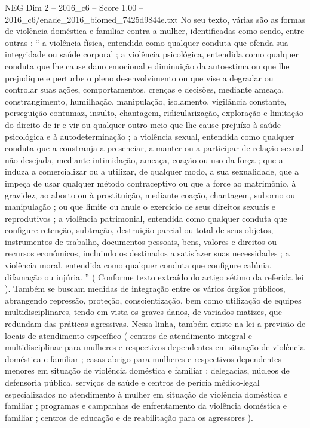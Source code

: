 \begin{textsample}{NEG Dim 2 – 2016\_c6 – Score 1.00 – 2016\_c6/enade\_2016\_biomed\_7425d9844e.txt}
No seu texto, várias são as formas de violência doméstica e familiar contra a mulher, identificadas como sendo, entre outras : “ a violência física, entendida como qualquer conduta que ofenda sua integridade ou saúde corporal ; a violência psicológica, entendida como qualquer conduta que lhe cause dano emocional e diminuição da autoestima ou que lhe prejudique e perturbe o pleno desenvolvimento ou que vise a degradar ou controlar suas ações, comportamentos, crenças e decisões, mediante ameaça, constrangimento, humilhação, manipulação, isolamento, vigilância constante, perseguição contumaz, insulto, chantagem, ridicularização, exploração e limitação do direito de ir e vir ou qualquer outro meio que lhe cause prejuízo à saúde psicológica e à autodeterminação ; a violência sexual, entendida como qualquer conduta que a constranja a presenciar, a manter ou a participar de relação sexual não desejada, mediante intimidação, ameaça, coação ou uso da força ; que a induza a comercializar ou a utilizar, de qualquer modo, a sua sexualidade, que a impeça de usar qualquer método contraceptivo ou que a force ao matrimônio, à gravidez, ao aborto ou à prostituição, mediante coação, chantagem, suborno ou manipulação ; ou que limite ou anule o exercício de seus direitos sexuais e reprodutivos ; a violência patrimonial, entendida como qualquer conduta que configure retenção, subtração, destruição parcial ou total de seus objetos, instrumentos de trabalho, documentos pessoais, bens, valores e direitos ou recursos econômicos, incluindo os destinados a satisfazer suas necessidades ; a violência moral, entendida como qualquer conduta que configure calúnia, difamação ou injúria. ” ( Conforme texto extraído do artigo sétimo da referida lei ).
Também se buscam medidas de integração entre os vários órgãos públicos, abrangendo repressão, proteção, conscientização, bem como utilização de equipes multidisciplinares, tendo em vista os graves danos, de variados matizes, que redundam das práticas agressivas.
Nessa linha, também existe na lei a previsão de locais de atendimento específico ( centros de atendimento integral e multidisciplinar para mulheres e respectivos dependentes em situação de violência doméstica e familiar ; casas-abrigo para mulheres e respectivos dependentes menores em situação de violência doméstica e familiar ; delegacias, núcleos de defensoria pública, serviços de saúde e centros de perícia médico-legal especializados no atendimento à mulher em situação de violência doméstica e familiar ; programas e campanhas de enfrentamento da violência doméstica e familiar ; centros de educação e de reabilitação para os agressores ).

\end{textsample}
